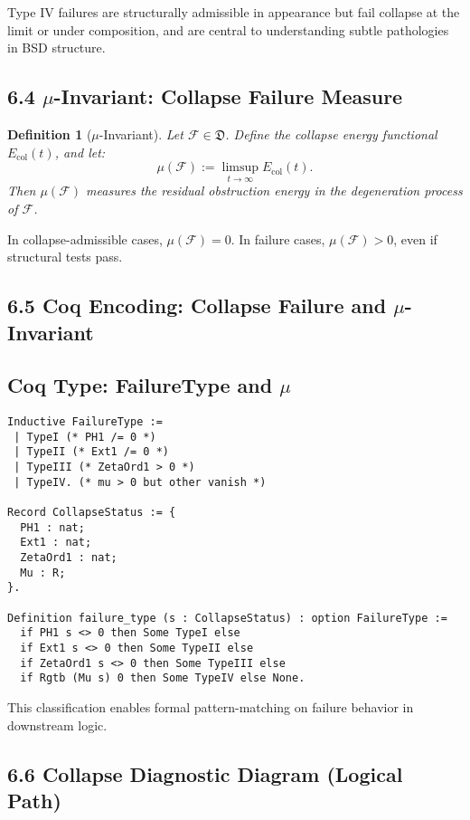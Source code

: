 \documentclass[11pt]{article}
\newtheorem{definition}[theorem]{Definition}
\begin{document}
Type IV failures are structurally admissible in appearance but fail collapse at the limit or under composition, and are central to understanding subtle pathologies in BSD structure.

\subsection*{6.4 \(\mu\)-Invariant: Collapse Failure Measure}

\begin{definition}[\(\mu\)-Invariant]
Let \( \mathcal{F} \in \mathfrak{D} \). Define the collapse energy functional \( E_{\mathrm{col}}(t) \), and let:
\[
\mu(\mathcal{F}) := \limsup_{t \to \infty} E_{\mathrm{col}}(t).
\]
Then \( \mu(\mathcal{F}) \) measures the residual obstruction energy in the degeneration process of \( \mathcal{F} \).
\end{definition}

In collapse-admissible cases, \( \mu(\mathcal{F}) = 0 \). In failure cases, \( \mu(\mathcal{F}) > 0 \), even if structural tests pass.

\subsection*{6.5 Coq Encoding: Collapse Failure and \(\mu\)-Invariant}

\subsection*{Coq Type: FailureType and \(\mu\)}
\begin{lstlisting}[language=Coq]
Inductive FailureType :=
 | TypeI (* PH1 /= 0 *)
 | TypeII (* Ext1 /= 0 *)
 | TypeIII (* ZetaOrd1 > 0 *)
 | TypeIV. (* mu > 0 but other vanish *)

Record CollapseStatus := {
  PH1 : nat;
  Ext1 : nat;
  ZetaOrd1 : nat;
  Mu : R;
}.

Definition failure_type (s : CollapseStatus) : option FailureType :=
  if PH1 s <> 0 then Some TypeI else
  if Ext1 s <> 0 then Some TypeII else
  if ZetaOrd1 s <> 0 then Some TypeIII else
  if Rgtb (Mu s) 0 then Some TypeIV else None.
\end{lstlisting}


This classification enables formal pattern-matching on failure behavior in downstream logic.

\subsection*{6.6 Collapse Diagnostic Diagram (Logical Path)}
\end{document}
